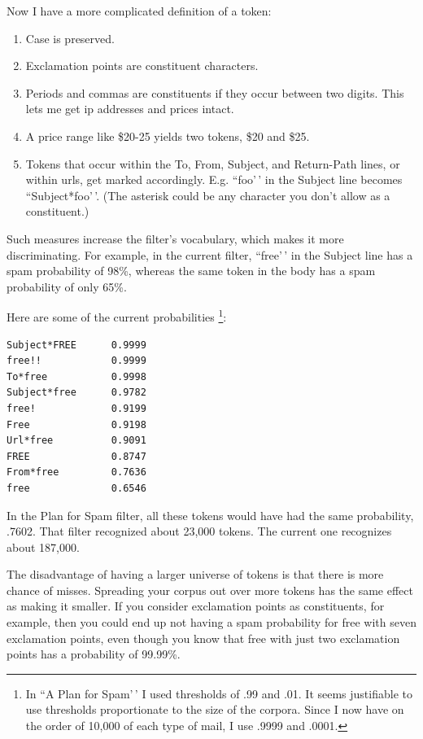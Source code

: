 Now I have a more complicated definition of a token:

\begin{enumerate}
\def\labelenumi{\arabic{enumi}.}
\item
  Case is preserved.
\item
  Exclamation points are constituent characters.
\item
  Periods and commas are constituents if they occur between two digits.
  This lets me get ip addresses and prices intact.
\item
  A price range like \$20-25 yields two tokens, \$20 and \$25.
\item
  Tokens that occur within the To, From, Subject, and Return-Path lines,
  or within urls, get marked accordingly. E.g. ``foo'\,' in the Subject
  line becomes ``Subject*foo'\,'. (The asterisk could be any character
  you don't allow as a constituent.)
\end{enumerate}

Such measures increase the filter's vocabulary, which makes it more
discriminating. For example, in the current filter, ``free'\,' in the
Subject line has a spam probability of 98\%, whereas the same token in
the body has a spam probability of only 65\%.

Here are some of the current probabilities \footnote{In ``A Plan for Spam'\,' I used thresholds of .99 and .01. It
seems justifiable to use thresholds proportionate to the size of the
corpora. Since I now have on the order of 10,000 of each type of mail, I
use .9999 and .0001.}:

\begin{verbatim}
Subject*FREE      0.9999
free!!            0.9999
To*free           0.9998
Subject*free      0.9782
free!             0.9199
Free              0.9198
Url*free          0.9091
FREE              0.8747
From*free         0.7636
free              0.6546
\end{verbatim}

In the Plan for Spam filter, all these tokens would have had the same
probability, .7602. That filter recognized about 23,000 tokens. The
current one recognizes about 187,000.

The disadvantage of having a larger universe of tokens is that there is
more chance of misses. Spreading your corpus out over more tokens has
the same effect as making it smaller. If you consider exclamation points
as constituents, for example, then you could end up not having a spam
probability for free with seven exclamation points, even though you know
that free with just two exclamation points has a probability of 99.99\%.


